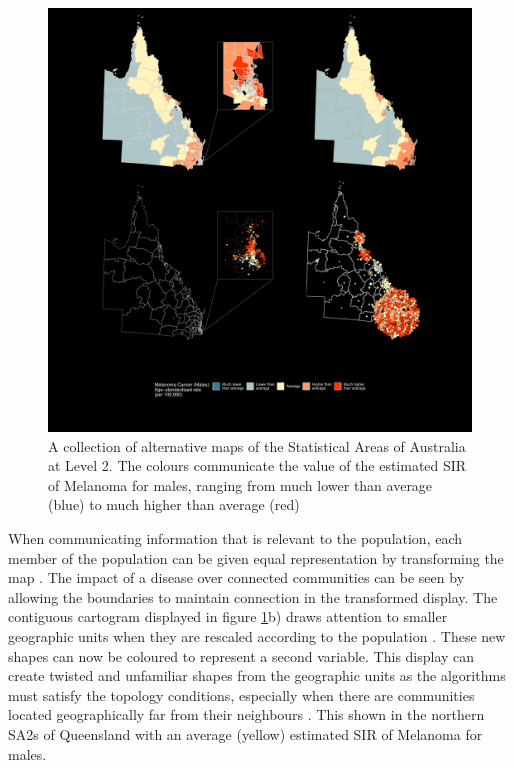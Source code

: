 \begin{figure}[h]
\centering
\includegraphics[width=14cm]{figs/qld_grid.pdf}
\caption{\label{fig:qld_grid}A collection of alternative maps of the Statistical Areas of Australia at Level 2. The colours communicate the value of the estimated SIR of Melanoma for males, ranging from much lower than average (blue) to much higher than average (red)}
\end{figure}

When communicating information that is relevant to the population, each
member of the population can be given equal representation by
transforming the map \citep{TVSSS}. The impact of a disease over
connected communities can be seen by allowing the boundaries to maintain
connection in the transformed display. The contiguous cartogram
displayed in figure \ref{fig:qld_grid}b) draws attention to smaller
geographic units when they are rescaled according to the population
\citep{DMAHP}. These new shapes can now be coloured to represent a
second variable. This display can create twisted and unfamiliar shapes
from the geographic units as the algorithms must satisfy the topology
conditions, especially when there are communities located geographically
far from their neighbours \citep{TVSSS}. This shown in the northern SA2s
of Queensland with an average (yellow) estimated SIR of Melanoma for
males.


